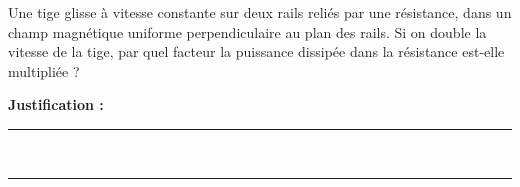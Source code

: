 Une tige glisse à vitesse constante sur deux rails reliés par une résistance, dans un champ magnétique uniforme perpendiculaire au plan des rails. Si on double la vitesse de la tige, par quel facteur la puissance dissipée dans la résistance est-elle multipliée ?

\choices

\noindent\textbf{Justification :} \hrulefill \\[2.5ex]
\rule{\linewidth}{0.4pt} \\[2.5ex]
\rule{\linewidth}{0.4pt}
\vfill
